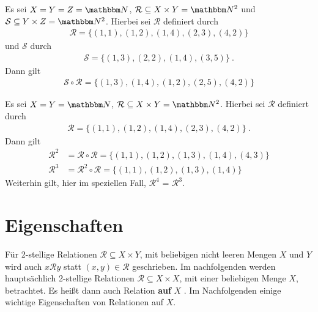 \begin{Unit}
  Es sei $X = Y = Z = \NN$, $\mathcal{R} \subseteq X \times Y = \NN^2$ und 
  $\mathcal{S} \subseteq Y \times Z = \NN^2$. Hierbei sei $\mathcal{R}$
  definiert durch
  \begin{align}
    \mathcal{R} = \{ (1,1), (1,2), (1,4), (2,3), (4,2)\}  
  \end{align}
  und $\mathcal{S}$ durch
  \begin{align}
    \mathcal{S} = \{ (1,3), (2,2), (1,4), (3,5)\} \ .  
  \end{align}
  Dann gilt
  \begin{align}
    \mathcal{S} \circ \mathcal{R} = \{ (1,3), (1,4), (1,2), (2,5), (4,2)\}
  \end{align} 
\end{Unit}

\begin{Unit}
  Es sei $X = Y = \NN$, $\mathcal{R} \subseteq X \times Y = \NN^2$. Hierbei 
  sei $\mathcal{R}$ definiert durch
  \begin{align}
    \mathcal{R} = \{ (1,1), (1,2), (1,4), (2,3), (4,2)\} \ .
  \end{align}
  Dann gilt
  \begin{align}
    \mathcal{R}^2 &= \mathcal{R} \circ \mathcal{R} = \{ (1,1), (1,2), (1,3), 
    (1,4), (4,3)\} \\
    \mathcal{R}^3 &= \mathcal{R}^2 \circ \mathcal{R} = \{ (1,1), (1,2), 
    (1,3), (1,4) \}
  \end{align} 
  Weiterhin gilt, hier im speziellen Fall, $\mathcal{R}^4$ = $\mathcal{R}^3$.
\end{Unit}


\section{Eigenschaften}
\label{sec:Relationen:Eigenschaften}

\begin{unit}
Für 2-stellige Relationen $\mathcal{R} \subseteq X \times Y$, mit beliebigen 
nicht leeren Mengen $X$ und $Y$ wird auch $x\mathcal{R}y$ statt $(x,y) \in
\mathcal{R}$ geschrieben. Im nachfolgenden werden hauptsächlich 2-stellige 
Relationen $\mathcal{R} \subseteq X \times X$, mit einer beliebigen Menge 
$X$, betrachtet. Es heißt dann auch Relation \textbf{auf} $X$
. Im Nachfolgenden einige wichtige Eigenschaften von 
Relationen auf $X$.
\end{unit}


